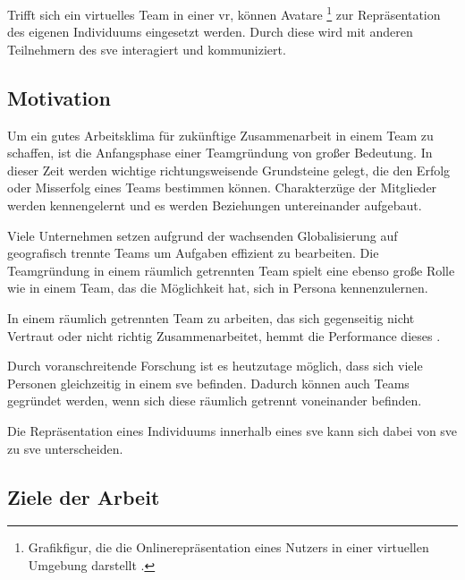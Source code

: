 \documentclass[a4paper,11pt]{article}%
\renewcommand{\\}{\vspace*{0.5\baselineskip} \newline}
\begin{document}
Trifft sich ein virtuelles Team in einer \ac{vr}, können Avatare \footnote{Grafikfigur, die die Onlinerepräsentation eines Nutzers in einer virtuellen Umgebung darstellt \citep[p.1]{neustaedter2009presenting}.} zur Repräsentation des eigenen Individuums eingesetzt werden. Durch diese wird mit anderen Teilnehmern des \ac{sve} interagiert und kommuniziert.

\newpage
	\subsection{Motivation}
	Um ein gutes Arbeitsklima für zukünftige Zusammenarbeit in einem Team zu schaffen, ist die Anfangsphase einer Teamgründung von großer Bedeutung. In dieser Zeit werden wichtige richtungsweisende Grundsteine gelegt, die den Erfolg oder Misserfolg eines Teams bestimmen können. Charakterzüge der Mitglieder werden kennengelernt und es werden Beziehungen untereinander aufgebaut.
	
	Viele Unternehmen setzen aufgrund der wachsenden Globalisierung auf geografisch trennte Teams um Aufgaben effizient zu bearbeiten. Die Teamgründung in einem räumlich getrennten Team spielt eine ebenso große Rolle wie in einem Team, das die Möglichkeit hat, sich in Persona kennenzulernen.
	
	In einem räumlich getrennten Team zu arbeiten, das sich gegenseitig nicht Vertraut oder nicht richtig Zusammenarbeitet, hemmt die Performance dieses \citep[p. 98-107]{huang1998supporting} \citep[p. 399-417]{turoff1993distributed}.
	
	
	Durch voranschreitende Forschung ist es heutzutage möglich, dass sich viele Personen gleichzeitig in einem \ac{sve} befinden. Dadurch können auch Teams gegründet werden, wenn sich diese räumlich getrennt voneinander befinden.
	
	Die Repräsentation eines Individuums innerhalb eines \ac{sve} kann sich dabei von \ac{sve} zu \ac{sve} unterscheiden.
	
	\subsection{Ziele der Arbeit}
%
\end{document}
